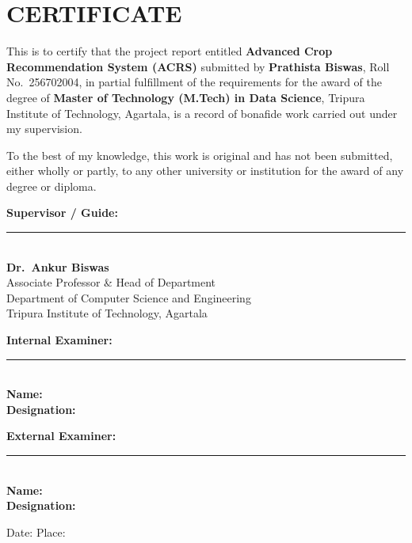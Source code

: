 \documentclass[12pt,a4paper,oneside]{report}
\begin{document}
\chapter*{CERTIFICATE}

\begin{singlespacing}
This is to certify that the project report entitled \textbf{Advanced Crop Recommendation System (ACRS)} submitted by \textbf{Prathista Biswas}, Roll No.\ 256702004, in partial fulfillment of the requirements for the award of the degree of \textbf{Master of Technology (M.Tech) in Data Science}, Tripura Institute of Technology, Agartala, is a record of bonafide work carried out under my supervision.

\vspace{0.4cm}
To the best of my knowledge, this work is original and has not been submitted, either wholly or partly, to any other university or institution for the award of any degree or diploma.

\vspace{1.0cm}
\noindent\textbf{Supervisor / Guide:}\\[0.5cm]
\noindent\rule{5cm}{0.4pt}\\[4pt]
\noindent\textbf{Dr.\ Ankur Biswas}\\
Associate Professor \& Head of Department\\
Department of Computer Science and Engineering\\
Tripura Institute of Technology, Agartala

\vspace{0.8cm}
\noindent\textbf{Internal Examiner:}\\[0.5cm]
\noindent\rule{5cm}{0.4pt}\\[4pt]
\noindent\textbf{Name:} \underline{\hspace{5cm}}\\[4pt]
\noindent\textbf{Designation:} \underline{\hspace{4cm}}

\vspace{0.8cm}
\noindent\textbf{External Examiner:}\\[0.5cm]
\noindent\rule{5cm}{0.4pt}\\[4pt]
\noindent\textbf{Name:} \underline{\hspace{5cm}}\\[4pt]
\noindent\textbf{Designation:} \underline{\hspace{4cm}}

\vspace{0.8cm}
\noindent Date: \underline{\hspace{3cm}} \qquad Place: \underline{\hspace{3cm}}
\end{singlespacing}
\newpage
\end{document}
